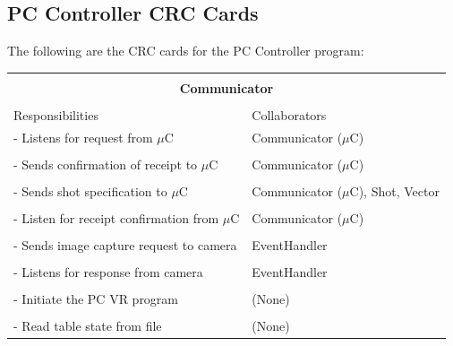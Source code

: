 \documentclass[titlepage]{article}
\begin{document}
\subsection{PC Controller CRC Cards}
The following are the CRC cards for the PC Controller program:\\
\begin{table}[!htbp]
\centering
\begin{tabular}{| p{} | p{} |}\hline
	\multicolumn{2}{|l|}{}\\
	\multicolumn{2}{|c|}{\large{\textbf{Communicator}}}\\
	\multicolumn{2}{|l|}{}\\\hline
	\vspace{0mm}\large{Responsibilities}\vspace{2mm} &\vspace{0mm}\large{Collaborators}\vspace{2mm}\\\hline
	\vspace{0mm}- Listens for request from $\mu$C	&\vspace{0mm}Communicator ($\mu$C)\\&\\
	- Sends confirmation of receipt to $\mu$C		&Communicator ($\mu$C)\\&\\
	- Sends shot specification to $\mu$C			&Communicator ($\mu$C), Shot, Vector\\&\\
	- Listen for receipt confirmation from $\mu$C	&Communicator ($\mu$C)\\&\\
	- Sends image capture request to camera			&EventHandler\\&\\
	- Listens for response from camera				&EventHandler\\&\\
	- Initiate the PC VR program					&(None)\\&\\
	- Read table state from file\vspace{2mm}		&(None)\vspace{2mm}\\\hline
\end{tabular}
\end{table}
\end{document}
